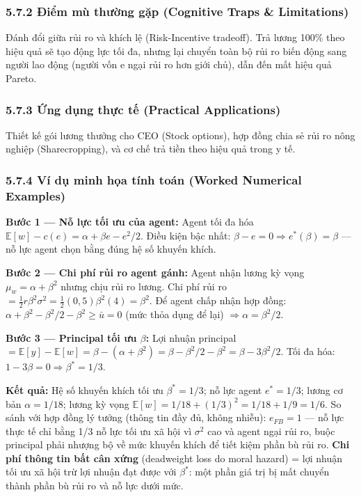 \documentclass[
]{article}
\begin{document}
\subsubsection{5.7.2 Điểm mù thường gặp (Cognitive Traps \&
Limitations)}\label{ux111iux1ec3m-muxf9-thux1b0ux1eddng-gux1eb7p-cognitive-traps-limitations-14}

Đánh đổi giữa rủi ro và khích lệ (Risk-Incentive tradeoff). Trả lương
100\% theo hiệu quả sẽ tạo động lực tối đa, nhưng lại chuyển toàn bộ rủi
ro biến động sang người lao động (người vốn e ngại rủi ro hơn giới chủ),
dẫn đến mất hiệu quả Pareto.

\subsubsection{5.7.3 Ứng dụng thực tế (Practical
Applications)}\label{ux1ee9ng-dux1ee5ng-thux1ef1c-tux1ebf-practical-applications-8}

Thiết kế gói lương thưởng cho CEO (Stock options), hợp đồng chia sẻ rủi
ro nông nghiệp (Sharecropping), và cơ chế trả tiền theo hiệu quả trong y
tế.

\subsubsection{5.7.4 Ví dụ minh họa tính toán (Worked Numerical
Examples)}\label{vuxed-dux1ee5-minh-hux1ecda-tuxednh-touxe1n-worked-numerical-examples-7}

\textbf{Bước 1 --- Nỗ lực tối ưu của agent:} Agent tối đa hóa
\(\mathbb{E}[w] - c(e) = \alpha + \beta e - e^2/2\). Điều kiện bậc nhất:
\(\beta - e = 0 \Rightarrow e^*(\beta) = \beta\) --- nỗ lực agent chọn
bằng đúng hệ số khuyến khích.

\textbf{Bước 2 --- Chi phí rủi ro agent gánh:} Agent nhận lương kỳ vọng
\(\mu_w = \alpha + \beta^2\) nhưng chịu rủi ro lương. Chi phí rủi ro
\(= \frac{1}{2} r \beta^2 \sigma^2 = \frac{1}{2}(0{,}5)\beta^2(4) = \beta^2\).
Để agent chấp nhận hợp đồng:
\(\alpha + \beta^2 - \beta^2/2 - \beta^2 \ge \bar{u} = 0\) (mức thỏa
dụng để lại) \(\Rightarrow \alpha = \beta^2/2\).

\textbf{Bước 3 --- Principal tối ưu \(\beta\):} Lợi nhuận principal
\(= \mathbb{E}[y] - \mathbb{E}[w] = \beta - (\alpha + \beta^2) = \beta - \beta^2/2 - \beta^2 = \beta - 3\beta^2/2\).
Tối đa hóa: \(1 - 3\beta = 0 \Rightarrow \beta^* = 1/3\).

\textbf{Kết quả:} Hệ số khuyến khích tối ưu \(\beta^* = 1/3\); nỗ lực
agent \(e^* = 1/3\); lương cơ bản \(\alpha = 1/18\); lương kỳ vọng
\(\mathbb{E}[w] = 1/18 + (1/3)^2 = 1/18 + 1/9 = 1/6\). So sánh với hợp
đồng lý tưởng (thông tin đầy đủ, không nhiễu): \(e_{FB} = 1\) --- nỗ lực
thực tế chỉ bằng 1/3 nỗ lực tối ưu xã hội vì \(\sigma^2\) cao và agent
ngại rủi ro, buộc principal phải nhượng bộ về mức khuyến khích để tiết
kiệm phần bù rủi ro. \textbf{Chi phí thông tin bất cân xứng} (deadweight
loss do moral hazard) = lợi nhuận tối ưu xã hội trừ lợi nhuận đạt được
với \(\beta^*\): một phần giá trị bị mất chuyển thành phần bù rủi ro và
nỗ lực dưới mức.
\end{document}
